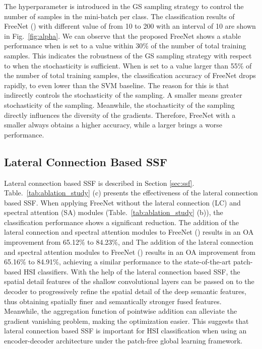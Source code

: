 \documentclass[journal]{IEEEtran}
\begin{document}
The hyperparameter  is introduced in the GS sampling strategy to control the number of samples in the mini-batch per class.
The classification results of FreeNet () with different value of  from 10 to 200 with an interval of 10 are shown in Fig.~\ref{fig:alpha}.
We can observe that the proposed FreeNet shows a stable performance when  is set to a value within 30\% of the number of total training samples.
This indicates the robustness of the GS sampling strategy with respect to  when the stochasticity is sufficient.
When  is set to a value larger than 55\% of the number of total training samples, the classification accuracy of FreeNet drops rapidly, to even lower than the SVM baseline.
The reason for this is that  indirectly controls the stochasticity of the sampling.
A smaller  means greater stochasticity of the sampling.
Meanwhile, the stochasticity of the sampling directly influences the diversity of the gradients.
Therefore, FreeNet with a smaller  always obtains a higher accuracy, while a larger  brings a worse performance.
\subsection{\textbf{Lateral Connection Based SSF}}
Lateral connection based SSF is described in Section \ref{sec:ssf}.
Table.~\ref{tab:ablation_study} (c) presents the effectiveness of the lateral connection based SSF.
When applying FreeNet without the lateral connection (LC) and spectral attention (SA) modules (Table.~\ref{tab:ablation_study} (b)), the classification performance shows a significant reduction.
The addition of the lateral connection and spectral attention modules to FreeNet () results in an OA improvement from 65.12\% to 84.23\%, and The addition of the lateral connection and spectral attention modules to FreeNet () results in an OA improvement from 65.16\% to 84.91\%, achieving a similar performance to the state-of-the-art patch-based HSI classifiers.
With the help of the lateral connection based SSF, the spatial detail features of the shallow convolutional layers can be passed on to the decoder to progressively refine the spatial detail of the deep semantic features, thus obtaining spatially finer and semantically stronger fused features.
Meanwhile, the aggregation function of pointwise addition can alleviate the gradient vanishing problem, making the optimization easier.
This suggests that lateral connection based SSF is important for HSI classification when using an encoder-decoder architecture under the patch-free global learning framework.
\end{document}
